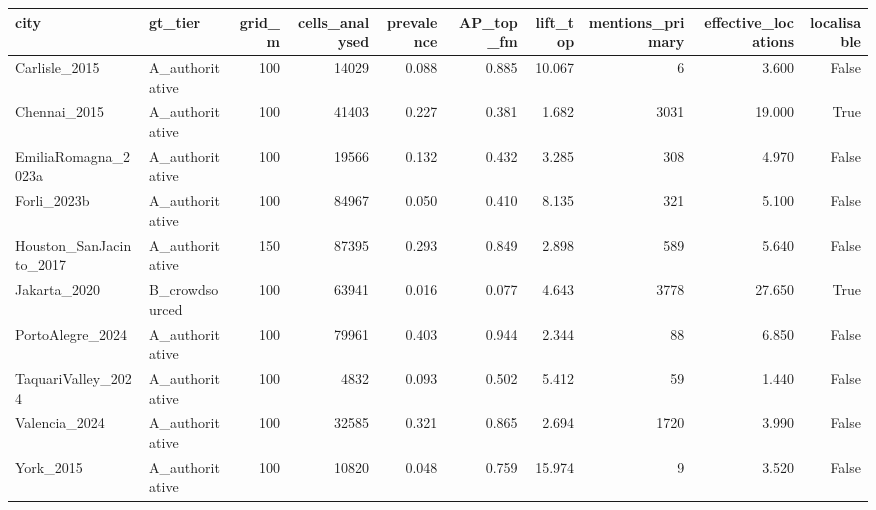 \begin{tabular}{llrrrrrrrr}
\toprule
city & gt_tier & grid_m & cells_analysed & prevalence & AP_top_fm & lift_top & mentions_primary & effective_locations & localisable \\
\midrule
Carlisle\_2015 & A\_authoritative & 100 & 14029 & 0.088 & 0.885 & 10.067 & 6 & 3.600 & False \\
Chennai\_2015 & A\_authoritative & 100 & 41403 & 0.227 & 0.381 & 1.682 & 3031 & 19.000 & True \\
EmiliaRomagna\_2023a & A\_authoritative & 100 & 19566 & 0.132 & 0.432 & 3.285 & 308 & 4.970 & False \\
Forli\_2023b & A\_authoritative & 100 & 84967 & 0.050 & 0.410 & 8.135 & 321 & 5.100 & False \\
Houston\_SanJacinto\_2017 & A\_authoritative & 150 & 87395 & 0.293 & 0.849 & 2.898 & 589 & 5.640 & False \\
Jakarta\_2020 & B\_crowdsourced & 100 & 63941 & 0.016 & 0.077 & 4.643 & 3778 & 27.650 & True \\
PortoAlegre\_2024 & A\_authoritative & 100 & 79961 & 0.403 & 0.944 & 2.344 & 88 & 6.850 & False \\
TaquariValley\_2024 & A\_authoritative & 100 & 4832 & 0.093 & 0.502 & 5.412 & 59 & 1.440 & False \\
Valencia\_2024 & A\_authoritative & 100 & 32585 & 0.321 & 0.865 & 2.694 & 1720 & 3.990 & False \\
York\_2015 & A\_authoritative & 100 & 10820 & 0.048 & 0.759 & 15.974 & 9 & 3.520 & False \\
\bottomrule
\end{tabular}
